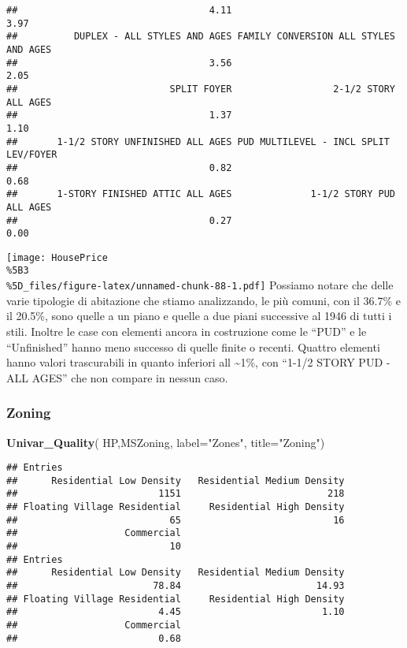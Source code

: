 \documentclass[
]{article}
\newenvironment{Shaded}{\begin{snugshade}}{\end{snugshade}}
\newcommand{\AttributeTok}[1]{\textcolor[rgb]{0.13,0.29,0.53}{#1}}
\newcommand{\FunctionTok}[1]{\textcolor[rgb]{0.13,0.29,0.53}{\textbf{#1}}}
\newcommand{\NormalTok}[1]{#1}
\newcommand{\StringTok}[1]{\textcolor[rgb]{0.31,0.60,0.02}{#1}}
\begin{document}
\begin{verbatim}
##                                  4.11                                  3.97 
##          DUPLEX - ALL STYLES AND AGES FAMILY CONVERSION ALL STYLES AND AGES 
##                                  3.56                                  2.05 
##                           SPLIT FOYER                  2-1/2 STORY ALL AGES 
##                                  1.37                                  1.10 
##       1-1/2 STORY UNFINISHED ALL AGES PUD MULTILEVEL - INCL SPLIT LEV/FOYER 
##                                  0.82                                  0.68 
##       1-STORY FINISHED ATTIC ALL AGES              1-1/2 STORY PUD ALL AGES 
##                                  0.27                                  0.00
\end{verbatim}

\texttt{[image: HousePrice\\\%5B3\\\%5D\_files/figure-latex/unnamed-chunk-88-1.pdf]}
Possiamo notare che delle varie tipologie di abitazione che stiamo
analizzando, le più comuni, con il 36.7\% e il 20.5\%, sono quelle a un
piano e quelle a due piani successive al 1946 di tutti i stili. Inoltre
le case con elementi ancora in costruzione come le ``PUD'' e le
``Unfinished'' hanno meno successo di quelle finite o recenti. Quattro
elementi hanno valori trascurabili in quanto inferiori all
\textasciitilde1\%, con ``1-1/2 STORY PUD - ALL AGES'' che non compare
in nessun caso.

\subsubsection{Zoning}\label{zoning}

\begin{Shaded}
\begin{Highlighting}[]
\FunctionTok{Univar\_Quality}\NormalTok{(}
\NormalTok{  HP,MSZoning,}
  \AttributeTok{label=}\StringTok{"Zones"}\NormalTok{,}
  \AttributeTok{title=}\StringTok{"Zoning"}\NormalTok{)}
\end{Highlighting}
\end{Shaded}

\begin{verbatim}
## Entries
##      Residential Low Density   Residential Medium Density 
##                         1151                          218 
## Floating Village Residential     Residential High Density 
##                           65                           16 
##                   Commercial 
##                           10 
## Entries
##      Residential Low Density   Residential Medium Density 
##                        78.84                        14.93 
## Floating Village Residential     Residential High Density 
##                         4.45                         1.10 
##                   Commercial 
##                         0.68
\end{verbatim}
\end{document}
